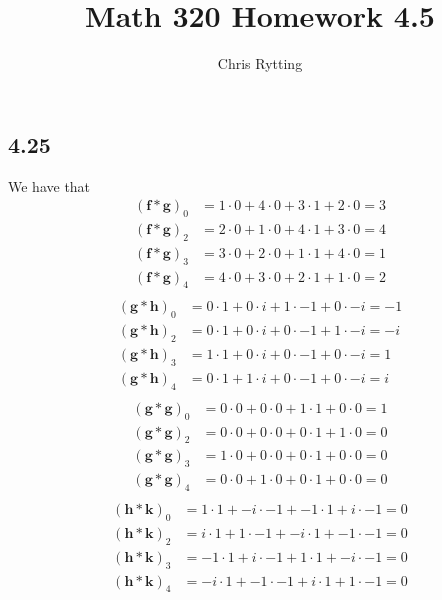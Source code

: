\documentclass[letterpaper,12pt]{article}
\title{Math 320 Homework 4.5}
\author{Chris Rytting}
\theoremstyle{definition}
\begin{document}
\maketitle
\subsection*{4.25}

We have that
\begin{align*}
(\textbf{f} \ast \textbf{g})_0  &=  1 \cdot 0 + 4 \cdot 0 + 3 \cdot 1 + 2 \cdot 0 = 3 \\
(\textbf{f} \ast \textbf{g})_2  &=  2 \cdot 0 + 1 \cdot 0 + 4 \cdot 1 + 3 \cdot 0 = 4 \\
(\textbf{f} \ast \textbf{g})_3  &=  3 \cdot 0 + 2 \cdot 0 + 1 \cdot 1 + 4 \cdot 0 = 1 \\
(\textbf{f} \ast \textbf{g})_4  &=  4 \cdot 0 + 3 \cdot 0 + 2 \cdot 1 + 1 \cdot 0 = 2 \\
\end{align*}
\begin{align*}
(\textbf{g} \ast \textbf{h})_0  &=  0 \cdot 1 + 0 \cdot i + 1 \cdot -1 + 0 \cdot -i = -1 \\
(\textbf{g} \ast \textbf{h})_2  &=  0 \cdot 1 + 0 \cdot i + 0 \cdot -1 + 1 \cdot -i = -i \\
(\textbf{g} \ast \textbf{h})_3  &=  1 \cdot 1 + 0 \cdot i + 0 \cdot -1 + 0 \cdot -i = 1 \\
(\textbf{g} \ast \textbf{h})_4  &=  0 \cdot 1 + 1 \cdot i + 0 \cdot -1 + 0 \cdot -i = i \\
\end{align*}
\begin{align*}
(\textbf{g} \ast \textbf{g})_0  &=  0 \cdot 0 + 0 \cdot 0 + 1 \cdot 1 + 0 \cdot 0 = 1 \\
(\textbf{g} \ast \textbf{g})_2  &=  0 \cdot 0 + 0 \cdot 0 + 0 \cdot 1 + 1 \cdot 0 = 0 \\
(\textbf{g} \ast \textbf{g})_3  &=  1 \cdot 0 + 0 \cdot 0 + 0 \cdot 1 + 0 \cdot 0 = 0 \\
(\textbf{g} \ast \textbf{g})_4  &=  0 \cdot 0 + 1 \cdot 0 + 0 \cdot 1 + 0 \cdot 0 = 0 \\
\end{align*}
\begin{align*}
(\textbf{h} \ast \textbf{k})_0  &=  1 \cdot  1 + -i \cdot -1 + -1 \cdot 1 +  i \cdot -1 = 0 \\
(\textbf{h} \ast \textbf{k})_2  &=  i \cdot  1 + 1  \cdot -1 + -i \cdot 1 + -1 \cdot -1 = 0 \\
(\textbf{h} \ast \textbf{k})_3  &=  -1 \cdot 1 + i  \cdot -1 +  1 \cdot 1 + -i \cdot -1 = 0 \\
(\textbf{h} \ast \textbf{k})_4  &=  -i \cdot 1 + -1 \cdot -1 +  i \cdot 1 +  1 \cdot -1 = 0 \\
\end{align*}
\end{document}
